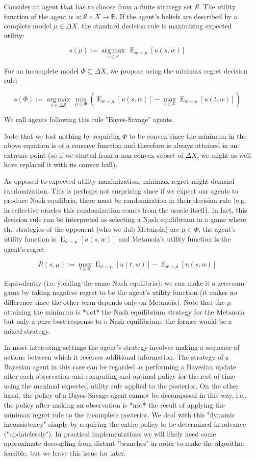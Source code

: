 \documentclass[a4paper]{article}
\DeclareMathOperator{\E}{E}
\newcommand{\Argmax}[1]{\underset{#1}{\operatorname{arg\,max}}\,}
\newcommand{\Reals}{\mathbb{R}}
\newcommand{\SP}[1]{\Delta #1}
\newcommand{\Strat}{\mathcal{S}}
\begin{document}
Consider an agent that has to choose from a finite strategy set ${\Strat}$. The utility function of the agent is ${u: \Strat \times X \rightarrow \Reals}$. If the agent's beliefs are described by a complete model ${\mu \in \SP{X}}$, the standard decision rule is maximizing expected utility: 

$${s(\mu):=\Argmax{s \in \Strat} \E_{w \sim \mu}[u(s,w)]}$$

For an incomplete model ${\Phi \subseteq \SP{X}}$, we propose using the minimax regret decision rule:

$$s(\Phi):=\Argmax{s \in \SP{\Strat}} \min_{\mu \in \Phi}(\E_{w \sim \mu}[u(s,w)] - \max_{t \in \Strat} \E_{w \sim \mu}[u(t,w)])$$

We call agents following this rule "Bayes-Savage" agents.

Note that we lost nothing by requiring ${\Phi}$ to be convex since the minimum in the above equation is of a concave function and therefore is always attained in an extreme point (so if we started from a non-convex subset of ${\SP{X}}$, we might as well have replaced it with its convex hull).

As opposed to expected utility maximization, minimax regret might demand randomization. This is perhaps not surprising since if we expect our agents to produce Nash equilibria, there must be randomization in their decision rule (e.g. in reflective oracles this randomization comes from the oracle itself). In fact, this decision rule can be interpreted as selecting a Nash equilibrium in a game where the strategies of the opponent (who we dub Metanoia) are ${\mu \in \Phi}$, the agent's utility function is ${\E_{w \sim \mu}[u(s,w)]}$ and Metanoia's utility function is the agent's regret 

$${R(s,\mu):=\max_{t \in \Strat} \E_{w \sim \mu}[u(t,w)]} - \E_{w \sim \mu}[u(s,w)]$$

Equivalently (i.e. yielding the same Nash equilibria), we can make it a zero-sum game by taking negative regret to be the agent's utility function (it makes no difference since the other term depends only on Metanoia). Note that the ${\mu}$ attaining the minimum is *not* the Nash equilibrium strategy for the Metanoia but only a pure best response to a Nash equilibrium: the former would be a mixed strategy.

In most interesting settings the agent's strategy involves making a sequence of actions between which it receives additional information. The strategy of a Bayesian agent in this case can be regarded as performing a Bayesian update after each observation and computing and optimal policy for the rest of time using the maximal expected utility rule applied to the posterior. On the other hand, the policy of a Bayes-Savage agent cannot be decomposed in this way, i.e., the policy after making an observation is *not* the result of applying the minimax regret rule to the incomplete posterior. We deal with this "dynamic inconsistency" simply by requiring the entire policy to be determined in advance ("updatelessly"). In practical implementations we will likely need some approximate decoupling from distant "branches" in order to make the algorithm feasible, but we leave this issue for later.
\end{document}

